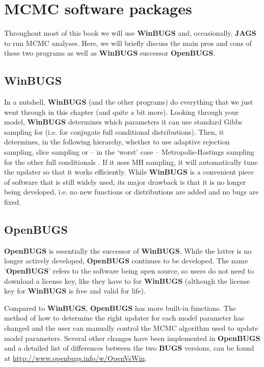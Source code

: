 \section{MCMC software packages}

Throughout most of this book we will use {\bf WinBUGS} and, occasionally, {\bf JAGS} to run MCMC analyses. 
Here, we will briefly discuss the main pros and cons of these two programs 
as well as {\bf WinBUGS} successor {\bf OpenBUGS}. 

\subsection{WinBUGS}

In a nutshell, {\bf WinBUGS} (and the other programs) do everything that we 
just went through in this chapter (and quite a bit more). Looking through 
your model, {\bf WinBUGS} determines which parameters it can use standard 
Gibbs sampling for (i.e. for conjugate full conditional distributions). 
Then, it determines, in the following hierarchy, whether to use adaptive 
rejection sampling, slice sampling or -- in the `worst' case -- 
Metropolis-Hastings sampling for the other full conditionals 
\citep{spiegelhalter_etal:2003}. If it uses MH sampling, it will 
automatically tune the updater so that it works efficiently.
While {\bf WinBUGS} is a convenient piece of software that is still 
widely used, its major drawback is that it is no longer being developed, 
i.e. no new functions or distributions are added and no bugs are fixed.

\subsection{OpenBUGS}
{\bf OpenBUGS} is essentially the successor of {\bf WinBUGS}. While the 
latter is
no longer actively developed, {\bf OpenBUGS} continues to be 
developed. The
name '{\bf OpenBUGS}' refers to the software being open source, so users 
do
not need to download a license key, like they have to for {\bf WinBUGS}
(although the license key for {\bf WinBUGS} is free and valid for life).

Compared to {\bf WinBUGS}, {\bf OpenBUGS} 
has  more built-in functions. The
method of how to determine the right updater for each model parameter
has changed and the user can manually control the MCMC algorithm used
to update model parameters.  Several other changes have been
implemented in {\bf OpenBUGS} and a detailed list of differences between the
two {\bf BUGS} versions, can be found at
\url{http://www.openbugs.info/w/OpenVsWin}.

